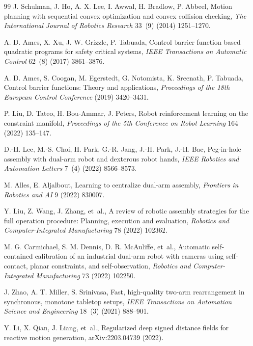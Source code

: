 \documentclass[preprint,12pt]{elsarticle}
\begin{document}
\begin{thebibliography}{99}
J. Schulman, J. Ho, A. X. Lee, I. Awwal, H. Bradlow, P. Abbeel,
Motion planning with sequential convex optimization and convex collision checking,
\textit{The International Journal of Robotics Research} 33~(9) (2014) 1251--1270.

A. D. Ames, X. Xu, J. W. Grizzle, P. Tabuada,
Control barrier function based quadratic programs for safety critical systems,
\textit{IEEE Transactions on Automatic Control} 62~(8) (2017) 3861--3876.

A. D. Ames, S. Coogan, M. Egerstedt, G. Notomista, K. Sreenath, P. Tabuada,
Control barrier functions: Theory and applications,
\textit{Proceedings of the 18th European Control Conference} (2019) 3420--3431.

P. Liu, D. Tateo, H. Bou-Ammar, J. Peters,
Robot reinforcement learning on the constraint manifold,
\textit{Proceedings of the 5th Conference on Robot Learning} 164 (2022) 135--147.

D.-H. Lee, M.-S. Choi, H. Park, G.-R. Jang, J.-H. Park, J.-H. Bae,
Peg-in-hole assembly with dual-arm robot and dexterous robot hands,
\textit{IEEE Robotics and Automation Letters} 7~(4) (2022) 8566--8573.

M. Alles, E. Aljalbout,
Learning to centralize dual-arm assembly,
\textit{Frontiers in Robotics and AI} 9 (2022) 830007.

Y. Liu, Z. Wang, J. Zhang, et~al.,
A review of robotic assembly strategies for the full operation procedure: Planning, execution and evaluation,
\textit{Robotics and Computer-Integrated Manufacturing} 78 (2022) 102362.

M. G. Carmichael, S. M. Dennis, D. R. McAuliffe, et~al.,
Automatic self-contained calibration of an industrial dual-arm robot with cameras using self-contact, planar constraints, and self-observation,
\textit{Robotics and Computer-Integrated Manufacturing} 73 (2022) 102250.

J. Zhao, A. T. Miller, S. Srinivasa,
Fast, high-quality two-arm rearrangement in synchronous, monotone tabletop setups,
\textit{IEEE Transactions on Automation Science and Engineering} 18~(3) (2021) 888--901.

Y. Li, X. Qian, J. Liang, et~al.,
Regularized deep signed distance fields for reactive motion generation,
arXiv:2203.04739 (2022).


\end{thebibliography}
\end{document}
